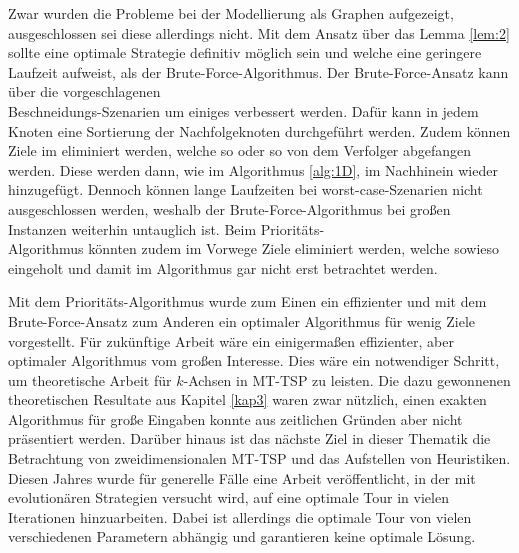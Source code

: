 \documentclass[german,version-2019-11]{uzl-thesis}
\begin{document}
Zwar wurden die Probleme bei der Modellierung als Graphen aufgezeigt, ausgeschlossen sei diese allerdings nicht. Mit dem Ansatz über das Lemma \ref{lem:2} sollte eine optimale Strategie definitiv möglich sein und welche eine geringere Laufzeit aufweist, als der Brute-Force-Algorithmus. Der Brute-Force-Ansatz kann über die vorgeschlagenen \\Beschneidungs-Szenarien um einiges verbessert werden. Dafür kann in jedem Knoten eine Sortierung der Nachfolgeknoten durchgeführt werden. Zudem können Ziele im eliminiert werden, welche so oder so von dem Verfolger abgefangen werden. Diese werden dann, wie im  Algorithmus \ref{alg:1D}, im Nachhinein wieder hinzugefügt. Dennoch können lange Laufzeiten bei worst-case-Szenarien nicht ausgeschlossen werden, weshalb der Brute-Force-Algorithmus bei großen Instanzen weiterhin  untauglich ist. Beim Prioritäts-\\Algorithmus könnten zudem im Vorwege Ziele eliminiert werden, welche sowieso eingeholt und damit im Algorithmus gar nicht erst betrachtet werden. 

Mit dem Prioritäts-Algorithmus wurde zum Einen ein effizienter und mit dem Brute-Force-Ansatz zum Anderen ein optimaler Algorithmus für wenig Ziele vorgestellt. Für zukünftige Arbeit wäre ein einigermaßen effizienter, aber optimaler Algorithmus vom großen Interesse. Dies wäre ein notwendiger Schritt, um theoretische Arbeit für $k$-Achsen in MT-TSP zu leisten. Die dazu gewonnenen theoretischen Resultate aus Kapitel \ref{kap3} waren zwar nützlich, einen exakten Algorithmus für große Eingaben konnte aus zeitlichen Gründen aber nicht präsentiert werden. Darüber hinaus ist das nächste Ziel in dieser Thematik die Betrachtung von zweidimensionalen MT-TSP und das Aufstellen von Heuristiken. Diesen Jahres wurde für generelle Fälle eine Arbeit \cite{moraes} veröffentlicht, in der mit evolutionären Strategien versucht wird, auf eine optimale Tour in vielen Iterationen hinzuarbeiten. Dabei ist allerdings die optimale Tour von vielen verschiedenen Parametern abhängig und garantieren keine optimale Lösung. 
\end{document}
